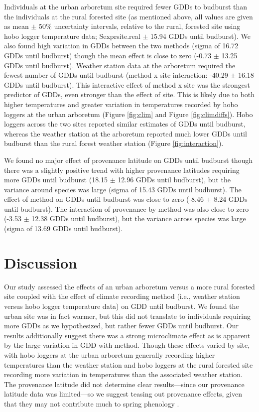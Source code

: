 \documentclass{article}\usepackage[]{graphicx}\usepackage[]{color}
\begin{document}
Individuals at the urban arboretum site required fewer GDDs to budburst than the individuals at the rural forested site (as mentioned above, all values are given as mean $\pm$ 50\% uncertainty intervals, relative to the rural, forested site using hobo logger temperature data; Sexpr{site.real} $\pm$ 15.94 GDDs until budburst). We also found high variation in GDDs between the two methods (sigma of 16.72 GDDs until budburst) though the mean effect is close to zero (-0.73 $\pm$ 13.25 GDDs until budburst). Weather station data at the arboretum required the fewest number of GDDs until budburst (method x site interaction: -40.29 $\pm$ 16.18 GDDs until budburst). This interactive effect of method x site was the strongest predictor of GDDs, even stronger than the effect of site. This is likely due to both higher temperatures and greater variation in temperatures recorded by hobo loggers at the urban arboretum (Figure \ref{fig:clim} and Figure \ref{fig:climdiffs}). Hobo loggers across the two sites reported similar estimates of GDDs until budburst, whereas the weather station at the arboretum reported much lower GDDs until budburst than the rural forest weather station (Figure \ref{fig:interaction}).

We found no major effect of provenance latitude on GDDs until budburst though there was a slightly positive trend with higher provenance latitudes requiring more GDDs until budburst (18.15 $\pm$ 12.96 GDDs until budburst), but the variance around species was large (sigma of 15.43 GDDs until budburst). The effect of method on GDDs until budburst was close to zero (-8.46 $\pm$ 8.24 GDDs until budburst). The interaction of provenance by method was also close to zero (-3.53 $\pm$ 12.38 GDDs until budburst), but the variance across species was large (sigma of 13.69 GDDs until budburst).

\section*{Discussion} 

Our study assessed the effects of an urban arboretum versus a more rural forested site coupled with the effect of climate recording method (i.e., weather station versus hobo logger temperature data) on GDD until budburst. We found the urban site was in fact warmer, but this did not translate to individuals requiring more GDDs as we hypothesized, but rather fewer GDDs until budburst. Our results additionally suggest there was a strong microclimate effect as is apparent by the large variation in GDD with method. Though these effects varied by site, with hobo loggers at the urban arboretum generally recording higher temperatures than the weather station and hobo loggers at the rural forested site recording more variation in temperatures than the associated weather station. The provenance latitude did not determine clear results---since our provenance latitude data was limited---so we suggest teasing out provenance effects, given that they may not contribute much to spring phenology \citep{Gauzere2017}. 
\end{document}
